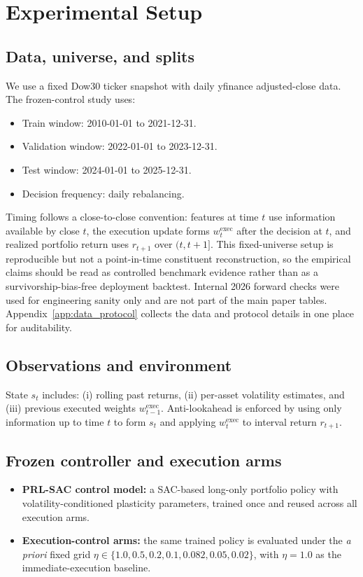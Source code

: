 \documentclass[10pt,twocolumn]{article}
\newcommand{\wexec}{w^{\mathrm{exec}}}
\begin{document}
\section{Experimental Setup}
\label{sec:exp}

\subsection{Data, universe, and splits}
We use a fixed Dow30 ticker snapshot with daily yfinance adjusted-close data. The frozen-control study uses:
\begin{itemize}[leftmargin=*,itemsep=1pt]
\item Train window: 2010-01-01 to 2021-12-31.
\item Validation window: 2022-01-01 to 2023-12-31.
\item Test window: 2024-01-01 to 2025-12-31.
\item Decision frequency: daily rebalancing.
\end{itemize}
Timing follows a close-to-close convention: features at time $t$ use information available by close $t$, the execution update forms $\wexec_t$ after the decision at $t$, and realized portfolio return uses $r_{t+1}$ over $(t,t+1]$. This fixed-universe setup is reproducible but not a point-in-time constituent reconstruction, so the empirical claims should be read as controlled benchmark evidence rather than as a survivorship-bias-free deployment backtest. Internal 2026 forward checks were used for engineering sanity only and are not part of the main paper tables. Appendix~\ref{app:data_protocol} collects the data and protocol details in one place for auditability.

\subsection{Observations and environment}
State $s_t$ includes: (i) rolling past returns, (ii) per-asset volatility estimates, and (iii) previous executed weights $\wexec_{t-1}$. Anti-lookahead is enforced by using only information up to time $t$ to form $s_t$ and applying $\wexec_t$ to interval return $r_{t+1}$.

\subsection{Frozen controller and execution arms}
\begin{itemize}[leftmargin=*,itemsep=1pt]
\item \textbf{PRL-SAC control model:} a SAC-based long-only portfolio policy with volatility-conditioned plasticity parameters, trained once and reused across all execution arms.
\item \textbf{Execution-control arms:} the same trained policy is evaluated under the \emph{a priori} fixed grid $\eta\in\{1.0, 0.5, 0.2, 0.1, 0.082, 0.05, 0.02\}$, with $\eta=1.0$ as the immediate-execution baseline.
\end{itemize}
\end{document}
